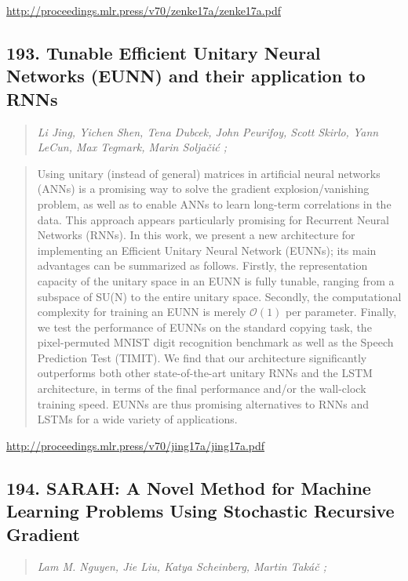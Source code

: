 \documentclass{article}
\begin{document}
\href{http://proceedings.mlr.press/v70/zenke17a/zenke17a.pdf}{http://proceedings.mlr.press/v70/zenke17a/zenke17a.pdf}

\subsection{193. Tunable Efficient Unitary Neural Networks (EUNN) and their application to RNNs}

\begin{quote}
\footnotesize{\textit{Li Jing, Yichen Shen, Tena Dubcek, John Peurifoy, Scott Skirlo, Yann LeCun, Max Tegmark, Marin Soljačić ;}}

\end{quote}

\begin{quote}
    Using unitary (instead of general) matrices in artificial neural networks (ANNs) is a promising way to solve the gradient explosion/vanishing problem, as well as to enable ANNs to learn long-term correlations in the data. This approach appears particularly promising for Recurrent Neural Networks (RNNs). In this work, we present a new architecture for implementing an Efficient Unitary Neural Network (EUNNs); its main advantages can be summarized as follows. Firstly, the representation capacity of the unitary space in an EUNN is fully tunable, ranging from a subspace of SU(N) to the entire unitary space. Secondly, the computational complexity for training an EUNN is merely $\mathcal{O}(1)$ per parameter. Finally, we test the performance of EUNNs on the standard copying task, the pixel-permuted MNIST digit recognition benchmark as well as the Speech Prediction Test (TIMIT). We find that our architecture significantly outperforms both other state-of-the-art unitary RNNs and the LSTM architecture, in terms of the final performance and/or the wall-clock training speed. EUNNs are thus promising alternatives to RNNs and LSTMs for a wide variety of applications.  
\end{quote}

\href{http://proceedings.mlr.press/v70/jing17a/jing17a.pdf}{http://proceedings.mlr.press/v70/jing17a/jing17a.pdf}

\subsection{194. SARAH: A Novel Method for Machine Learning Problems Using Stochastic Recursive Gradient}

\begin{quote}
\footnotesize{\textit{Lam M. Nguyen, Jie Liu, Katya Scheinberg, Martin Takáč ;}}

\end{quote}
\end{document}
